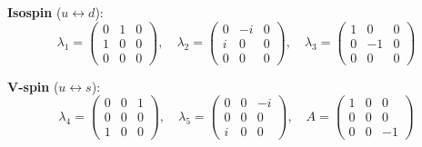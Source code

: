 \documentclass[12pt]{article}
\begin{document}
\noindent\textbf{Isospin} ($u\leftrightarrow d$):
\begin{equation*}
  \lambda_1 =
  \begin{pmatrix} 0 & 1 & 0 \\ 1 & 0 & 0 \\ 0 & 0 & 0 \end{pmatrix},\quad
  \lambda_2 =
  \begin{pmatrix} 0 & -i & 0 \\ i & 0 & 0 \\ 0 & 0 & 0 \end{pmatrix},\quad
  \lambda_3 =
  \begin{pmatrix} 1 & 0 & 0 \\ 0 & -1 & 0 \\ 0 & 0 & 0 \end{pmatrix}
\end{equation*}

\noindent\textbf{V-spin} ($u\leftrightarrow s$):
\begin{equation*}
  \lambda_4 =
  \begin{pmatrix} 0 & 0 & 1 \\ 0 & 0 & 0 \\ 1 & 0 & 0 \end{pmatrix},\quad
  \lambda_5 =
  \begin{pmatrix} 0 & 0 & -i \\ 0 & 0 & 0 \\ i & 0 & 0 \end{pmatrix},\quad
  A =
  \begin{pmatrix} 1 & 0 & 0 \\ 0 & 0 & 0 \\ 0 & 0 & -1 \end{pmatrix}
\end{equation*}
\end{document}
